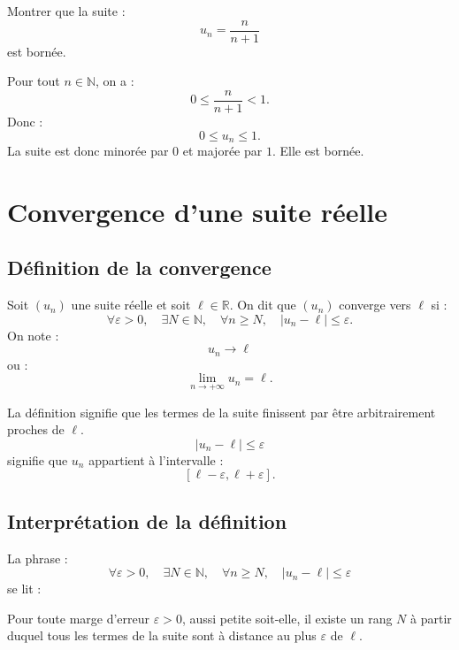 \documentclass[11pt,a4paper]{article}
\newcommand{\N}{\mathbb N}
\newcommand{\R}{\mathbb R}
\newcommand{\abs}[1]{\left|#1\right|}
\begin{document}
\begin{exercicebox}
Montrer que la suite :
\[
u_n=\frac{n}{n+1}
\]
est bornée.
\end{exercicebox}

\begin{correctionbox}
Pour tout \(n\in\N\), on a :
\[
0\leq \frac{n}{n+1}<1.
\]
Donc :
\[
0\leq u_n\leq1.
\]
La suite est donc minorée par \(0\) et majorée par \(1\).  
Elle est bornée.
\end{correctionbox}

\section{Convergence d'une suite réelle}

\subsection{Définition de la convergence}

\begin{definitionbox}
Soit \((u_n)\) une suite réelle et soit \(\ell\in\R\).  
On dit que \((u_n)\) converge vers \(\ell\) si :
\[
\forall \varepsilon>0,\quad \exists N\in\N,\quad \forall n\geq N,\quad \abs{u_n-\ell}\leq \varepsilon.
\]
On note :
\[
u_n\longrightarrow \ell
\]
ou :
\[
\lim_{n\to+\infty}u_n=\ell.
\]
\end{definitionbox}

\begin{retenirbox}
La définition signifie que les termes de la suite finissent par être arbitrairement proches de \(\ell\).
\[
\abs{u_n-\ell}\leq\varepsilon
\]
signifie que \(u_n\) appartient à l'intervalle :
\[
[\ell-\varepsilon,\ell+\varepsilon].
\]
\end{retenirbox}

\subsection{Interprétation de la définition}

La phrase :
\[
\forall \varepsilon>0,\quad \exists N\in\N,\quad \forall n\geq N,\quad \abs{u_n-\ell}\leq \varepsilon
\]
se lit :

\begin{center}
Pour toute marge d'erreur \(\varepsilon>0\), aussi petite soit-elle, il existe un rang \(N\) à partir duquel tous les termes de la suite sont à distance au plus \(\varepsilon\) de \(\ell\).
\end{center}
\end{document}
